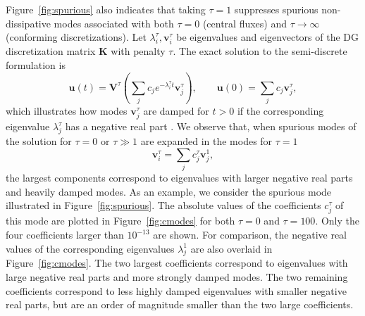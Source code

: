 \documentclass[preprint,10pt]{elsarticle}
\newcommand{\LRp}[1]{\left( #1 \right)}
\begin{document}
Figure~\ref{fig:spurious} also indicates that taking $\tau = 1$ suppresses spurious non-dissipative modes associated with both $\tau = 0$ (central fluxes) and $\tau\rightarrow \infty$ (conforming discretizations).  Let $\lambda^{\tau}_i, \bm{v}^{\tau}_i$ be eigenvalues and eigenvectors of the DG discretization matrix $\bm{K}$ with penalty $\tau$.  The exact solution to the semi-discrete formulation is 
\[
\bm{u}(t) =\bm{V}^{\tau}\LRp{ \sum_j c_j e^{-\lambda_i^{\tau} t} \bm{v}^{\tau}_j}, \qquad \bm{u}(0) = \sum_j c_j\bm{v}^{\tau}_j,
\]
which illustrates how modes $\bm{v}^{\tau}_j$ are damped for $t > 0$ if the corresponding eigenvalue $\lambda^{\tau}_j$ has a negative real part .  We observe that, when spurious modes of the solution for $\tau = 0$ or $\tau \gg 1$ are expanded in the modes for $\tau = 1$
\[
\bm{v}^{\tau}_i = \sum_j c^\tau_j \bm{v}^{1}_j, 
\]
the largest components correspond to eigenvalues with larger negative real parts and heavily damped modes.  As an example, we consider the spurious mode illustrated in Figure~\ref{fig:spurious}.  The absolute values of the coefficients $c^\tau_j$ of this mode are plotted in Figure~\ref{fig:cmodes} for both $\tau = 0$ and $\tau = 100$.  Only the four coefficients larger than $10^{-13}$ are shown.  For comparison, the negative real values of the corresponding eigenvalues $\lambda^1_j$ are also overlaid in Figure~\ref{fig:cmodes}.  The two largest coefficients correspond to eigenvalues with large negative real parts and more strongly damped modes.  The two remaining coefficients correspond to less highly damped eigenvalues with smaller negative real parts, but are an order of magnitude smaller than the two large coefficients.  
\end{document}

